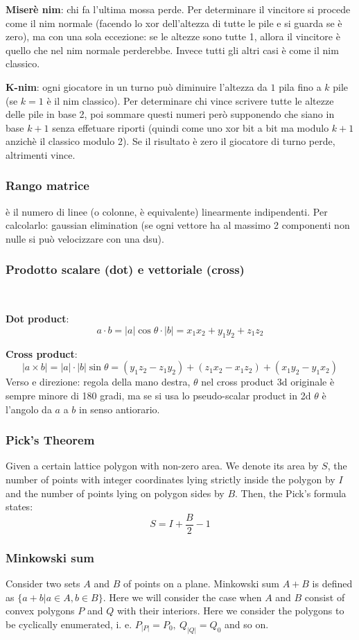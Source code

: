 \textbf{Miserè nim}: chi fa l'ultima mossa perde. Per determinare il vincitore si procede come il nim normale (facendo lo xor dell'altezza di tutte le pile e si guarda se è zero), ma con una sola eccezione: se le altezze sono tutte 1, allora il vincitore è quello che nel nim normale perderebbe. Invece tutti gli altri casi è come il nim classico.

\textbf{K-nim}: ogni giocatore in un turno può diminuire l'altezza da $1$ pila fino a $k$ pile (se $k=1$ è il nim classico). Per determinare chi vince scrivere tutte le altezze delle pile in base 2, poi sommare questi numeri però supponendo che siano in base $k+1$ senza effetuare riporti (quindi come uno xor bit a bit ma modulo $k+1$ anzichè il classico modulo 2). Se il risultato è zero il giocatore di turno perde, altrimenti vince.

\subsubsection{Rango matrice}
è il numero di linee (o colonne, è equivalente) linearmente indipendenti. Per calcolarlo: gaussian elimination (se ogni vettore ha al massimo 2 componenti non nulle si può velocizzare con una dsu).

\subsubsection{Prodotto scalare (dot) e vettoriale (cross)} 
\,

\textbf{Dot product}: 
$$a\cdot b = |a| \cos \theta \cdot |b| = x_1 x_2 + y_1 y_2 + z_1 z_2$$

\textbf{Cross product}:  
$$|a\times b| = |a| \cdot |b| \sin \theta = (y_1 z_2 - z_1 y_2) + (z_1 x_2 - x_1 z_2) + (x_1 y_2 - y_1 x_2)$$ 
Verso e direzione: regola della mano destra, $\theta$ nel cross product 3d originale è sempre minore di 180 gradi, ma se si usa lo pseudo-scalar product in 2d $\theta$ è l'angolo da $a$ a $b$ in senso antiorario.

\subsubsection{Pick's Theorem}
Given a certain lattice polygon with non-zero area.
We denote its area by $S$, the number of points with integer coordinates lying strictly inside the polygon by $I$ and the number of points lying on polygon sides by $B$.
Then, the Pick's formula states: $$S=I+\frac{B}{2}-1$$

\subsubsection{Minkowski sum}
Consider two sets $A$ and $B$ of points on a plane. Minkowski sum $A + B$ is defined as $\{a + b| a \in A, b \in B\}$.
Here we will consider the case when $A$ and $B$ consist of convex polygons $P$ and $Q$ with their interiors.
Here we consider the polygons to be cyclically enumerated, i. e. $P_{|P|} = P_0,\ Q_{|Q|} = Q_0$ and so on.

